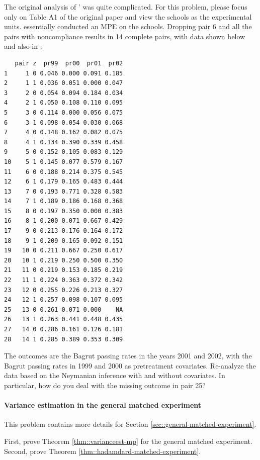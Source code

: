 The original analysis of \citet{angrist2009effects}' was quite complicated. For this problem, please focus only on Table A1 of the original paper and view the schools as the experimental units. \citet{angrist2009effects} essentially conducted an MPE on the schools. Dropping pair 6 and all the pairs with noncompliance results in 14 complete pairs, with data shown below and also in : 
\begin{lstlisting}
   pair z  pr99  pr00  pr01  pr02
1     1 0 0.046 0.000 0.091 0.185
2     1 1 0.036 0.051 0.000 0.047
3     2 0 0.054 0.094 0.184 0.034
4     2 1 0.050 0.108 0.110 0.095
5     3 0 0.114 0.000 0.056 0.075
6     3 1 0.098 0.054 0.030 0.068
7     4 0 0.148 0.162 0.082 0.075
8     4 1 0.134 0.390 0.339 0.458
9     5 0 0.152 0.105 0.083 0.129
10    5 1 0.145 0.077 0.579 0.167
11    6 0 0.188 0.214 0.375 0.545
12    6 1 0.179 0.165 0.483 0.444
13    7 0 0.193 0.771 0.328 0.583
14    7 1 0.189 0.186 0.168 0.368
15    8 0 0.197 0.350 0.000 0.383
16    8 1 0.200 0.071 0.667 0.429
17    9 0 0.213 0.176 0.164 0.172
18    9 1 0.209 0.165 0.092 0.151
19   10 0 0.211 0.667 0.250 0.617
20   10 1 0.219 0.250 0.500 0.350
21   11 0 0.219 0.153 0.185 0.219
22   11 1 0.224 0.363 0.372 0.342
23   12 0 0.255 0.226 0.213 0.327
24   12 1 0.257 0.098 0.107 0.095
25   13 0 0.261 0.071 0.000    NA
26   13 1 0.263 0.441 0.448 0.435
27   14 0 0.286 0.161 0.126 0.181
28   14 1 0.285 0.389 0.353 0.309
\end{lstlisting}
The outcomes are the Bagrut passing rates in the years 2001 and 2002, with the Bagrut passing rates in 1999 and 2000 as pretreatment covariates. Re-analyze the data based on the Neymanian inference with and without covariates. In particular, how do you deal with the missing outcome in pair 25? 
 
 
\paragraph{Variance estimation in the general matched experiment} 
 \label{para::variance-general-matched}

This problem contains more details for Section  \ref{sec::general-matched-experiment}. 
 
 
First, prove Theorem  \ref{thm::varianceest-mp} for the general matched experiment.
Second, prove Theorem \ref{thm::hadamdard-matched-experiment}. 
 
